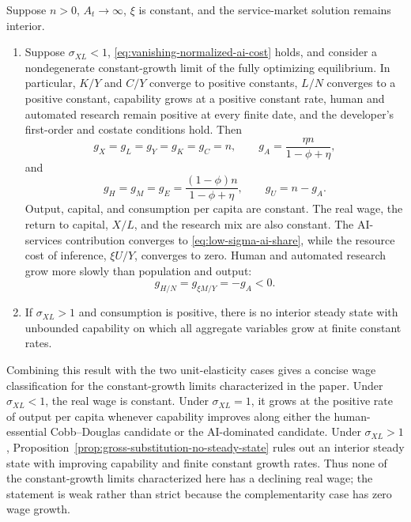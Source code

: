 \begin{conditionalresult}
\label{cond:nonunit-ces-steady-states}
Suppose $n>0$, $A_t\to\infty$, $\xi$ is constant, and the service-market solution
remains interior.
\begin{enumerate}[label=(\roman*)]
    \item Suppose $\sigma_{XL}<1$, \eqref{eq:vanishing-normalized-ai-cost} holds,
    and consider a nondegenerate constant-growth limit of the fully optimizing
    equilibrium. In particular, $K/Y$ and $C/Y$ converge to positive constants,
    $L/N$ converges to a positive constant, capability grows at a positive constant
    rate, human and automated research remain positive at every finite date, and the
    developer's first-order and costate conditions hold. Then
    \begin{equation}
        g_X=g_L=g_Y=g_K=g_C=n,
        \qquad
        g_A=\frac{\eta n}{1-\phi+\eta},
        \label{eq:low-sigma-optimizing-growth-rates}
    \end{equation}
    and
    \begin{equation}
        g_H=g_M=g_E
        =\frac{(1-\phi)n}{1-\phi+\eta},
        \qquad
        g_U=n-g_A.
        \label{eq:low-sigma-optimizing-research-rates}
    \end{equation}
    Output, capital, and consumption per capita are constant. The real wage, the
    return to capital, $X/L$, and the research mix are also constant. The AI-services
    contribution converges to \eqref{eq:low-sigma-ai-share}, while the resource cost
    of inference, $\xi U/Y$, converges to zero. Human and automated research grow
    more slowly than population and output:
    \begin{equation}
        g_{H/N}=g_{\xi M/Y}=-g_A<0.
        \label{eq:low-sigma-declining-research-shares}
    \end{equation}
    \item If $\sigma_{XL}>1$ and consumption is positive, there is no interior
    steady state with unbounded capability on which all aggregate variables grow at
    finite constant rates.
\end{enumerate}
\end{conditionalresult}

Combining this result with the two unit-elasticity cases gives a concise wage
classification for the constant-growth limits characterized in the paper. Under
$\sigma_{XL}<1$, the real wage is constant. Under $\sigma_{XL}=1$, it grows at the
positive rate of output per capita whenever capability improves along either the
human-essential Cobb--Douglas candidate or the AI-dominated candidate. Under
$\sigma_{XL}>1$, Proposition~\ref{prop:gross-substitution-no-steady-state} rules out
an interior steady state with improving capability and finite constant growth
rates. Thus none of the constant-growth limits characterized here has a declining
real wage; the statement is weak rather than strict because the complementarity
case has zero wage growth.


